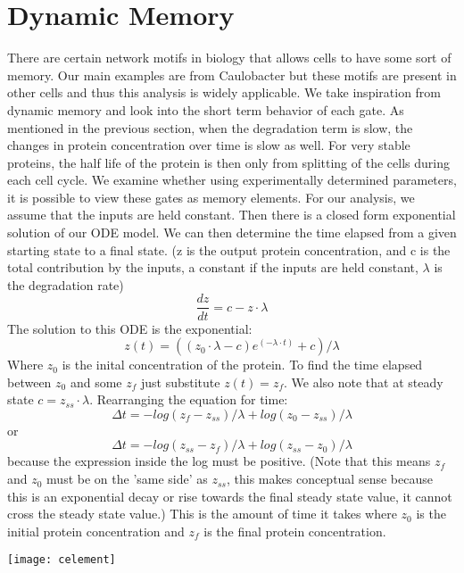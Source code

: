 \documentclass{article}
\begin{document}
\section{Dynamic Memory}
There are certain network motifs in biology that allows cells to have some sort of memory.  Our main examples are from Caulobacter but these motifs are present in other cells and thus this analysis is widely applicable.  
We take inspiration from dynamic memory and look into the short term behavior of each gate.  As mentioned in the previous section, when the degradation term is slow, the changes in protein concentration over time is slow as well.  For very stable proteins, the half life of the protein is then only from splitting of the cells during each cell cycle.  We examine whether using experimentally determined parameters, it is possible to view these gates as memory elements.  For our analysis, we assume that the inputs are held constant.  Then there is a closed form exponential solution of our ODE model.  We can then determine the time elapsed from a given starting state to a final state.  (z is the output protein concentration, and c is the total contribution by the inputs, a constant if the inputs are held constant, $\lambda$ is the degradation rate)
\[\frac{dz}{dt}=c-z\cdot\lambda
\]
The solution to this ODE is the exponential:
\[z(t)=((z_0\cdot\lambda-c)e^{(-\lambda\cdot t)}+c)/\lambda
\]
Where $z_0$ is the inital concentration of the protein.  To find the time elapsed between $z_0$ and some $z_f$ just substitute $z(t)=z_f$.  We also note that at steady state $c=z_{ss}\cdot\lambda$.  Rearranging the equation for time:
\[\Delta t= -log(z_f-z_{ss})/ \lambda+ log(z_0-z_{ss})/ \lambda
\]
or
\[\Delta t= -log(z_{ss}-z_f)/ \lambda+ log(z_{ss}-z_0)/ \lambda
\]
because the expression inside the log must be positive.  (Note that this means $z_f$ and $z_0$ must be on the 'same side' as $z_{ss}$, this makes conceptual sense because this is an exponential decay or rise towards the final steady state value, it cannot cross the steady state value.)
 This is the amount of time it takes where $z_0$ is the initial protein concentration and $z_f$ is the final protein concentration.
\newline
\begin{center}
\texttt{[image: celement]}
\end{center}
\end{document}
